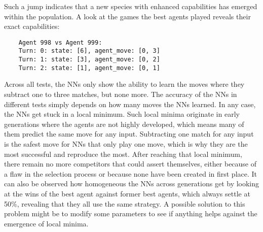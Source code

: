 Such a jump indicates that a new species with enhanced capabilities has emerged within the population.
A look at the games the best agents played reveals their exact capabilities:
\begin{verbatim}
    Agent 998 vs Agent 999:
    Turn: 0: state: [6], agent_move: [0, 3]
    Turn: 1: state: [3], agent_move: [0, 2]
    Turn: 2: state: [1], agent_move: [0, 1]
\end{verbatim}
Across all tests, the NNs only show the ability to learn the moves where they subtract one to three matches, but none more.
The accuracy of the NNs in different tests simply depends on how many moves the NNs learned.
In any case, the NNs get stuck in a local minimum.
Such local minima originate in early generations where the agents are not highly developed, which means many of them predict the same move for any input.
Subtracting one match for any input is the safest move for NNs that only play one move, which is why they are the most successful and reproduce the most.
After reaching that local minimum, there remain no more competitors that could assert themselves, either because of a flaw in the selection process or because none have been created in first place.
It can also be observed how homogeneous the NNs across generations get by looking at the wins of the best agent against former best agents, which always settle at 50\%, revealing that they all use the same strategy.
A possible solution to this problem might be to modify some parameters to see if anything helps against the emergence of local minima.


